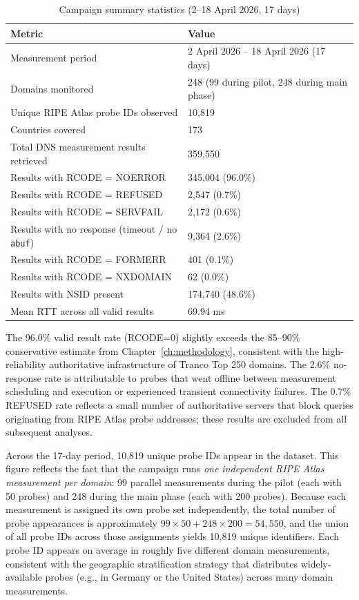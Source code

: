 \begin{table}[H]
\centering
\small
\caption{Campaign summary statistics (2--18 April 2026, 17 days)}
\label{tab:4.1}
\begin{tabular}{l l}
\toprule
\textbf{Metric} & \textbf{Value} \\
\midrule
Measurement period & 2 April 2026 -- 18 April 2026 (17 days) \\
Domains monitored & 248 (99 during pilot, 248 during main phase) \\
Unique RIPE Atlas probe IDs observed & 10,819 \\
Countries covered & 173 \\
Total DNS measurement results retrieved & 359,550 \\
Results with RCODE = NOERROR & 345,004 (96.0\%) \\
Results with RCODE = REFUSED & 2,547 (0.7\%) \\
Results with RCODE = SERVFAIL & 2,172 (0.6\%) \\
Results with no response (timeout / no \texttt{abuf}) & 9,364 (2.6\%) \\
Results with RCODE = FORMERR & 401 (0.1\%) \\
Results with RCODE = NXDOMAIN & 62 (0.0\%) \\
Results with NSID present & 174,740 (48.6\%) \\
Mean RTT across all valid results & 69.94 ms \\
\bottomrule
\end{tabular}
\end{table}

The 96.0\% valid result rate (RCODE=0) slightly exceeds the 85--90\% conservative estimate from Chapter~\ref{ch:methodology}, consistent with the high-reliability authoritative infrastructure of Tranco Top 250 domains. The 2.6\% no-response rate is attributable to probes that went offline between measurement scheduling and execution or experienced transient connectivity failures. The 0.7\% REFUSED rate reflects a small number of authoritative servers that block queries originating from RIPE Atlas probe addresses; these results are excluded from all subsequent analyses.

Across the 17-day period, 10,819 unique probe IDs appear in the dataset. This figure reflects the fact that the campaign runs \emph{one independent RIPE Atlas measurement per domain}: 99 parallel measurements during the pilot (each with 50 probes) and 248 during the main phase (each with 200 probes). Because each measurement is assigned its own probe set independently, the total number of probe appearances is approximately $99 \times 50 + 248 \times 200 = 54{,}550$, and the union of all probe IDs across those assignments yields 10,819 unique identifiers. Each probe ID appears on average in roughly five different domain measurements, consistent with the geographic stratification strategy that distributes widely-available probes (e.g., in Germany or the United States) across many domain measurements.

